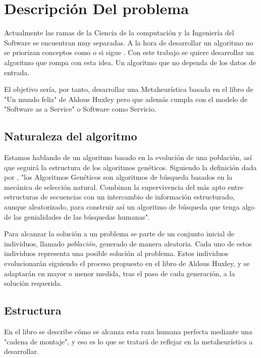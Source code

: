 \chapter{Descripción Del problema}

Actualmente las ramas de la Ciencia de la computación y la Ingeniería del Software se encuentran muy separadas. A la
hora de desarrollar un algoritmo no se priorizan conceptos como \cite[arquitectura limpia]{cleanArquitecture2017} o si 
sigue \cite[estándares de código]{cleanCode2008}. Con este trabajo se quiere desarrollar un algoritmo que rompa con esta idea. 
Un algoritmo que no dependa de los datos de entrada.

El objetivo sería, por tanto, desarrollar una Metaheurística basada en el libro de "Un mundo feliz" de Aldous
Huxley pero que además cumpla con el modelo de "Software as a Service" o Software como Servicio.

\section{Naturaleza del algoritmo}

Estamos hablando de un algoritmo basado en la evolución de una población, así que seguirá la estructura de los
algoritmos genéticos. Siguiendo la definición dada por \cite[Goldberg]{goldberg89}, "los Algoritmos Genéticos son algoritmos de búsqueda
basados en la mecánica de selección natural. Combinan la supervivencia del más apto entre estructuras de secuencias con un intercambio de 
información estructurado, aunque aleatorizado, para construir así un algoritmo
de búsqueda que tenga algo de las genialidades de las búsquedas humanas".

Para alcanzar la solución a un problema se parte de un conjunto inicial de individuos, llamado \textit{población},
generado de manera aleatoria. Cada uno de estos individuos representa una posible solución al problema. Estos individuos
evolucionarán siguiendo el proceso propuesto en el libro de Aldous Huxley, y se adaptarán en mayor o menor medida,
tras el paso de cada generación, a la solución requerida.

\section{Estructura}

En el libro se describe cómo se alcanza esta raza humana perfecta mediante una "cadena de montaje", y eso es lo que se
tratará de reflejar en la metaheurística a desarrollar.

